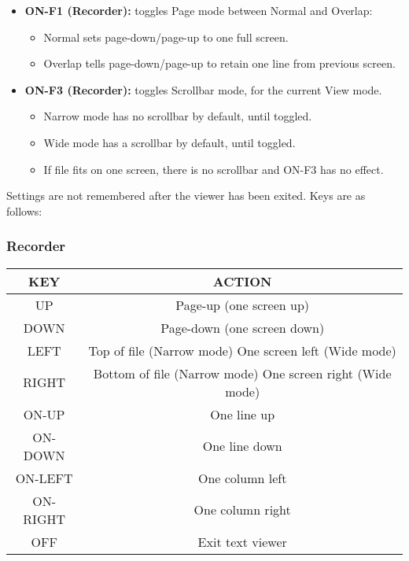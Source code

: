 \begin{itemize}
\item \textbf{ON{}-F1 (Recorder):} 
toggles Page mode between Normal and Overlap:

\begin{itemize}
\item Normal sets page{}-down/page{}-up to one full screen.
\item Overlap tells page{}-down/page{}-up to retain one line from
previous screen.
\end{itemize}

\item \textbf{ON{}-F3 (Recorder):} 
toggles Scrollbar mode, for the current View mode.

\begin{itemize}
\item Narrow mode has no scrollbar by default, until toggled.
\item Wide mode has a scrollbar by default, until toggled.
\item If file fits on one screen, there is no scrollbar and ON{}-F3 has
no effect.
\end{itemize}
\end{itemize}

Settings are not remembered after the viewer has been exited. 
Keys are as follows:

\subsubsection{Recorder}

\begin{table}[h!]
\begin{tabular}{|c|c|}
\hline
KEY & ACTION \\\hline
UP & Page{}-up (one screen up) \\\hline
DOWN & Page{}-down (one screen down) \\\hline
LEFT & Top of file (Narrow mode) One screen left (Wide mode) \\\hline
RIGHT & Bottom of file (Narrow mode) One screen right (Wide mode) \\\hline
ON{}-UP & One line up \\\hline
ON{}-DOWN & One line down \\\hline
ON{}-LEFT & One column left \\\hline
ON{}-RIGHT & One column right \\\hline
OFF & Exit text viewer \\\hline
\end{tabular}
\end{table}


